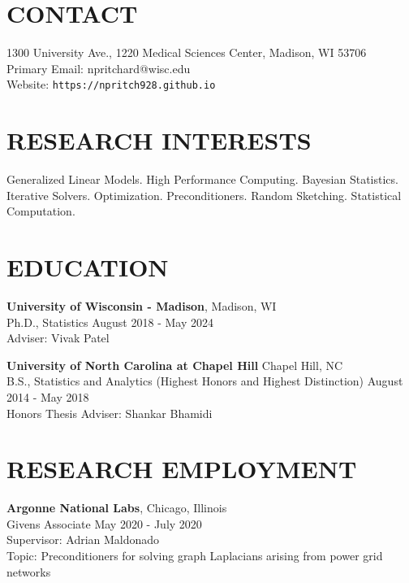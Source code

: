 \documentclass[margin,11pt]{res}
\begin{document}
  
                        
\begin{resume}                        
  
  \section{CONTACT} 
  1300 University Ave., 1220 Medical Sciences Center, Madison, WI 53706 \\
  Primary Email: npritchard@wisc.edu \\
  Website: \texttt{https://npritch928.github.io}

  \section{RESEARCH INTERESTS}
  Generalized Linear Models. High Performance Computing. Bayesian Statistics. Iterative Solvers. Optimization. Preconditioners. Random Sketching. Statistical Computation.
              
\section{EDUCATION}      
                {\bf University of Wisconsin - Madison}, \hfill Madison, WI \\
                Ph.D., Statistics \hfill August 2018 - May 2024\\
		        Adviser: Vivak Patel 
                
                {\bf University of North Carolina at Chapel Hill} \hfill Chapel Hill, NC \\
                B.S., Statistics and Analytics (Highest Honors and Highest Distinction) \hfill August 2014 - May 2018\\
                Honors Thesis Adviser: Shankar Bhamidi
  
\section{RESEARCH EMPLOYMENT}
                {\bf Argonne National Labs}, \hfill Chicago, Illinois\\
                Givens Associate \hfill May 2020 - July 2020\\
                Supervisor: Adrian Maldonado\\
                Topic: Preconditioners for solving graph Laplacians arising from power grid networks
                

\end{resume}
\end{document}
